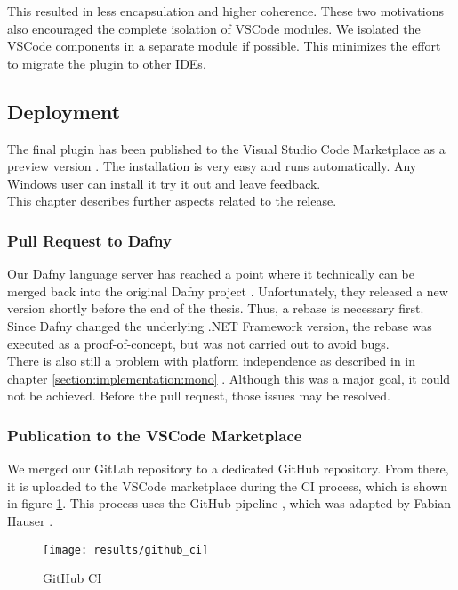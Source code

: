 This resulted in less encapsulation and higher coherence.
These two motivations also encouraged the complete isolation of VSCode modules.
We isolated the VSCode components in a separate module if possible.
This minimizes the effort to migrate the plugin to other IDEs.


\subsection{Deployment}
The final plugin has been published to the Visual Studio Code Marketplace as a preview version \cite{our-dafny-plugin}.
The installation is very easy and runs automatically.
Any Windows user can install it \textendash{} try it out and leave feedback.\\

This chapter describes further aspects related to the release.

\subsubsection{Pull Request to Dafny}
Our Dafny language server has reached a point where it technically can be merged back into the original Dafny project \cite{dafny_lang_github}.
Unfortunately, they released a new version shortly before the end of the thesis.
Thus, a rebase is necessary first.
Since Dafny changed the underlying .NET Framework version, the rebase was executed as a proof-of-concept, but was not carried out to avoid bugs.\\

There is also still a problem with platform independence as described in in chapter
\ref{section:implementation:mono} \textendash{} .
Although this was a major goal, it could not be achieved.
Before the pull request, those issues may be resolved.


\subsubsection{Publication to the VSCode Marketplace}
We merged our GitLab repository to a dedicated GitHub repository.
From there, it is uploaded to the VSCode marketplace during the CI process, which is shown in figure \ref{fig:github_ci}.
This process uses the GitHub pipeline , which
was adapted by Fabian Hauser \cite{our-dafny-plugin-github-publish}.

\begin{figure}[H]
    \centering
    \texttt{[image: results/github\_ci]}
    \caption{GitHub CI}
    \label{fig:github_ci}
\end{figure}

